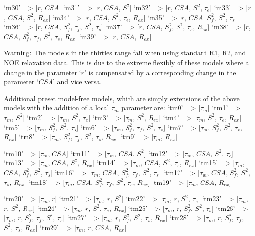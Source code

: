     `m30'   => [$r$, $CSA$]
    `m31'   => [$r$, $CSA$, $S^2$]
    `m32'   => [$r$, $CSA$, $S^2$, $\tau_e$]
    `m33'   => [$r$, $CSA$, $S^2$, $R_{ex}$]
    `m34'   => [$r$, $CSA$, $S^2$, $\tau_e$, $R_{ex}$]
    `m35'   => [$r$, $CSA$, $S^2_f$, $S^2$, $\tau_s$]
    `m36'   => [$r$, $CSA$, $S^2_f$, $\tau_f$, $S^2$, $\tau_s$]
    `m37'   => [$r$, $CSA$, $S^2_f$, $S^2$, $\tau_s$, $R_{ex}$]
    `m38'   => [$r$, $CSA$, $S^2_f$, $\tau_f$, $S^2$, $\tau_s$, $R_{ex}$]
    `m39'   => [$r$, $CSA$, $R_{ex}$]

Warning:  The models in the thirties range fail when using standard R1, R2, and NOE
relaxation data.  This is due to the extreme flexibly of these models where a change in the
parameter `$r$' is compensated by a corresponding change in the parameter `$CSA$' and
vice versa.


Additional preset model-free models, which are simply extensions of the above models with
the addition of a local $\tau_m$ parameter are:
    `tm0'   => [$\tau_m$]
    `tm1'   => [$\tau_m$, $S^2$]
    `tm2'   => [$\tau_m$, $S^2$, $\tau_e$]
    `tm3'   => [$\tau_m$, $S^2$, $R_{ex}$]
    `tm4'   => [$\tau_m$, $S^2$, $\tau_e$, $R_{ex}$]
    `tm5'   => [$\tau_m$, $S^2_f$, $S^2$, $\tau_s$]
    `tm6'   => [$\tau_m$, $S^2_f$, $\tau_f$, $S^2$, $\tau_s$]
    `tm7'   => [$\tau_m$, $S^2_f$, $S^2$, $\tau_s$, $R_{ex}$]
    `tm8'   => [$\tau_m$, $S^2_f$, $\tau_f$, $S^2$, $\tau_s$, $R_{ex}$]
    `tm9'   => [$\tau_m$, $R_{ex}$]

    `tm10'  => [$\tau_m$, $CSA$]
    `tm11'  => [$\tau_m$, $CSA$, $S^2$]
    `tm12'  => [$\tau_m$, $CSA$, $S^2$, $\tau_e$]
    `tm13'  => [$\tau_m$, $CSA$, $S^2$, $R_{ex}$]
    `tm14'  => [$\tau_m$, $CSA$, $S^2$, $\tau_e$, $R_{ex}$]
    `tm15'  => [$\tau_m$, $CSA$, $S^2_f$, $S^2$, $\tau_s$]
    `tm16'  => [$\tau_m$, $CSA$, $S^2_f$, $\tau_f$, $S^2$, $\tau_s$]
    `tm17'  => [$\tau_m$, $CSA$, $S^2_f$, $S^2$, $\tau_s$, $R_{ex}$]
    `tm18'  => [$\tau_m$, $CSA$, $S^2_f$, $\tau_f$, $S^2$, $\tau_s$, $R_{ex}$]
    `tm19'  => [$\tau_m$, $CSA$, $R_{ex}$]

    `tm20'  => [$\tau_m$, $r$]
    `tm21'  => [$\tau_m$, $r$, $S^2$]
    `tm22'  => [$\tau_m$, $r$, $S^2$, $\tau_e$]
    `tm23'  => [$\tau_m$, $r$, $S^2$, $R_{ex}$]
    `tm24'  => [$\tau_m$, $r$, $S^2$, $\tau_e$, $R_{ex}$]
    `tm25'  => [$\tau_m$, $r$, $S^2_f$, $S^2$, $\tau_s$]
    `tm26'  => [$\tau_m$, $r$, $S^2_f$, $\tau_f$, $S^2$, $\tau_s$]
    `tm27'  => [$\tau_m$, $r$, $S^2_f$, $S^2$, $\tau_s$, $R_{ex}$]
    `tm28'  => [$\tau_m$, $r$, $S^2_f$, $\tau_f$, $S^2$, $\tau_s$, $R_{ex}$]
    `tm29'  => [$\tau_m$, $r$, $CSA$, $R_{ex}$]


